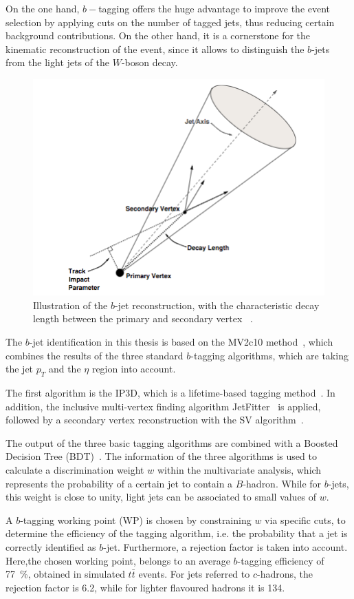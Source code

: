 On the one hand, $b-$tagging offers the huge advantage to improve the event selection by applying cuts on the number of tagged jets, thus reducing certain background contributions. On the other hand, it is a cornerstone for the kinematic reconstruction of the event, since it allows to distinguish the $b$-jets from the light jets of the $W$-boson decay. 

\begin{figure}[h]
	\centering
	\includegraphics[width=0.5\linewidth]{Pics/btag.png}
	\caption{ Illustration of the $b$-jet reconstruction, with the characteristic decay length between the primary and secondary vertex ~\cite{ATLAS:2010rza}.} 
	\label{fig:42}
\end{figure}

The $b$-jet identification in this thesis is based on the MV2c10 method~\cite{ATL-PHYS-PUB-2016-012}, which combines the results of the three standard  $b$-tagging algorithms, which are taking the jet $p_T$ and the $\eta$ region into account.

 The first algorithm is the IP3D, which is a lifetime-based tagging method~\cite{ATL-PHYS-PUB-2016-012}. In addition, the inclusive multi-vertex finding algorithm JetFitter~\cite{Piacquadio:2008zza} is applied, followed by a secondary vertex reconstruction with the SV algorithm~\cite{ATLAS-CONF-2011-102}.

 The output of the three basic  tagging algorithms are combined with a Boosted Decision Tree (BDT)~\cite{ATL-PHYS-PUB-2016-012}. 
The information of the three algorithms is 
 used to calculate a discrimination weight $w$ within the multivariate analysis, which represents  the probability of a certain jet  to contain a $B$-hadron.  While for $b$-jets, this weight is close to unity, light jets can be associated to small values of $w$.


 
A $b$-tagging working point (WP) is chosen by constraining $w$ via specific cuts, to determine the efficiency of the tagging algorithm, i.e. the probability that a jet is correctly identified as $b$-jet. 
 Furthermore, a rejection factor is taken into account.  Here,the chosen working point, belongs to an average $b$-tagging efficiency of 77~\%, obtained in simulated $t\bar{t}$ events. For jets referred to  $c$-hadrons, the rejection factor is 6.2, while for lighter flavoured  hadrons it is 134. 
 


